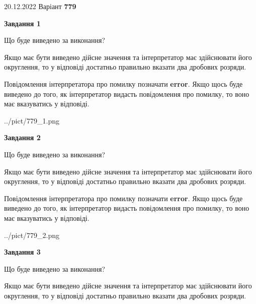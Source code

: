 \documentclass[12pt, ukrainian]{article}
\begin{document}
{20.12.2022 Варіант \No \textbf { 779 }\par}
{
\begin {Large}

{\begin {center}\textbf{Завдання 1}\end {center}}\par
Що буде виведено за виконання? \par

Якщо має бути виведено дійсне значення та інтерпретатор має здійснювати його округлення, 
то у відповіді достатньо правильно вказати два дробових розряди.

Повідомлення інтерпретатора про помилку позначати \textbf{error}.
Якщо щось буде виведено до того, як інтерпретатор видасть повідомлення про помилку, 
то воно має вказуватись у відповіді. \par

\begin{center}
	{../pict/779_1.png}
\end{center}
\newpage

{\begin {center}\textbf{Завдання 2}\end {center}}\par
Що буде виведено за виконання? \par

Якщо має бути виведено дійсне значення та інтерпретатор має здійснювати його округлення, 
то у відповіді достатньо правильно вказати два дробових розряди.

Повідомлення інтерпретатора про помилку позначати \textbf{error}.
Якщо щось буде виведено до того, як інтерпретатор видасть повідомлення про помилку, 
то воно має вказуватись у відповіді. \par

\begin{center}
	{../pict/779_2.png}
\end{center}
\newpage

{\begin {center}\textbf{Завдання 3}\end {center}}\par
Що буде виведено за виконання? \par

Якщо має бути виведено дійсне значення та інтерпретатор має здійснювати його округлення, 
то у відповіді достатньо правильно вказати два дробових розряди.


\end{Large}}
\end{document}
